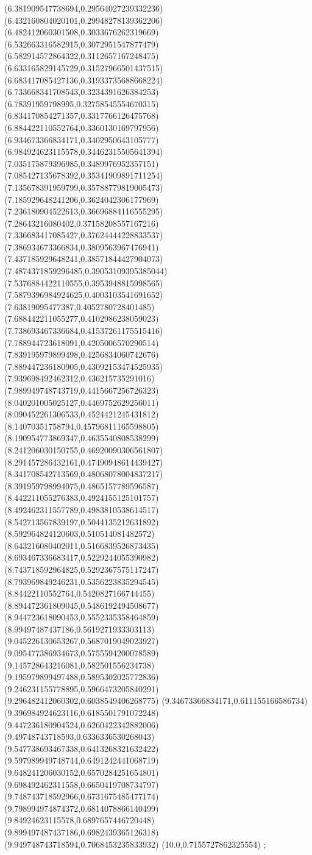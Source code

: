 {(6.381909547738694,0.29564027239332236)
(6.432160804020101,0.29948278139362206)
(6.482412060301508,0.3033676262319669)
(6.532663316582915,0.3072951547877479)
(6.582914572864322,0.3112657167248475)
(6.633165829145729,0.31527966501437515)
(6.683417085427136,0.31933735688668224)
(6.733668341708543,0.3234391626384253)
(6.78391959798995,0.32758545554670315)
(6.834170854271357,0.3317766126475768)
(6.884422110552764,0.3360130169797956)
(6.934673366834171,0.3402950643105777)
(6.984924623115578,0.34462315505641394)
(7.035175879396985,0.3489976952357151)
(7.085427135678392,0.35341909891711254)
(7.135678391959799,0.35788779819005473)
(7.185929648241206,0.3624042306177969)
(7.236180904522613,0.36696884116555295)
(7.28643216080402,0.37158208557167216)
(7.336683417085427,0.37624444228833537)
(7.386934673366834,0.3809563967476941)
(7.437185929648241,0.38571844427904073)
(7.4874371859296485,0.39053109395385044)
(7.5376884422110555,0.3953948815998565)
(7.5879396984924625,0.4003103541691652)
(7.63819095477387,0.4052780728401485)
(7.688442211055277,0.4102986238059023)
(7.738693467336684,0.41537261175515416)
(7.788944723618091,0.4205006570290514)
(7.839195979899498,0.4256834060742676)
(7.889447236180905,0.43092153474525935)
(7.939698492462312,0.436215735291016)
(7.989949748743719,0.4415667256726323)
(8.040201005025127,0.4469752629256011)
(8.090452261306533,0.4524421245431812)
(8.14070351758794,0.45796811165598805)
(8.190954773869347,0.4635540808538299)
(8.241206030150755,0.46920090306561807)
(8.291457286432161,0.47490948614439427)
(8.341708542713569,0.48068078004837217)
(8.391959798994975,0.4865157789596587)
(8.442211055276383,0.4924155125101757)
(8.492462311557789,0.4983810538614517)
(8.542713567839197,0.5044135212631892)
(8.592964824120603,0.510514081482572)
(8.643216080402011,0.5166839526873435)
(8.693467336683417,0.5229244055390982)
(8.743718592964825,0.5292367575117247)
(8.793969849246231,0.5356223835294545)
(8.84422110552764,0.5420827166744455)
(8.894472361809045,0.5486192494508677)
(8.944723618090453,0.5552335358464859)
(8.99497487437186,0.5619271933303113)
(9.045226130653267,0.5687019049023927)
(9.095477386934673,0.5755594200078589)
(9.145728643216081,0.582501556234738)
(9.195979899497488,0.5895302025772836)
(9.246231155778895,0.5966473205840291)
(9.296482412060302,0.6038549406268775)
(9.34673366834171,0.611155166586734)
(9.396984924623116,0.6185501791072248)
(9.447236180904524,0.6260422342882006)
(9.49748743718593,0.6336336530268043)
(9.547738693467338,0.6413268321632422)
(9.597989949748744,0.6491242441068719)
(9.648241206030152,0.6570284251654801)
(9.698492462311558,0.6650419708734797)
(9.748743718592966,0.6731675485477174)
(9.798994974874372,0.6814078866140499)
(9.84924623115578,0.6897657446720448)
(9.899497487437186,0.6982439365126318)
(9.949748743718594,0.7068453235833932)
(10.0,0.7155727862325554)
};

